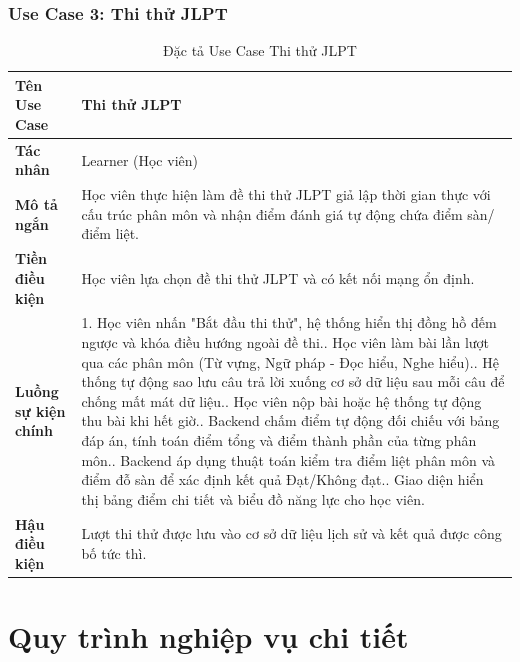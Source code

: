 \documentclass[../DoAn.tex]{subfiles}
\begin{document}
\subsubsection*{Use Case 3: Thi thử JLPT}
\begin{table}[H]
\centering
\small
\renewcommand{\arraystretch}{1.2}


\begin{tabular}{|p{3.5cm}|p{11.0cm}|}
\hline
\textbf{Tên Use Case} & Thi thử JLPT \\
\hline
\textbf{Tác nhân} & Learner (Học viên) \\
\hline
\textbf{Mô tả ngắn} & Học viên thực hiện làm đề thi thử JLPT giả lập thời gian thực với cấu trúc phân môn và nhận điểm đánh giá tự động chứa điểm sàn/điểm liệt. \\
\hline
\textbf{Tiền điều kiện} & Học viên lựa chọn đề thi thử JLPT và có kết nối mạng ổn định. \\
\hline
\textbf{Luồng sự kiện chính} & 
1. Học viên nhấn "Bắt đầu thi thử", hệ thống hiển thị đồng hồ đếm ngược và khóa điều hướng ngoài đề thi.\newline
2. Học viên làm bài lần lượt qua các phân môn (Từ vựng, Ngữ pháp - Đọc hiểu, Nghe hiểu).\newline
3. Hệ thống tự động sao lưu câu trả lời xuống cơ sở dữ liệu sau mỗi câu để chống mất mát dữ liệu.\newline
4. Học viên nộp bài hoặc hệ thống tự động thu bài khi hết giờ.\newline
5. Backend chấm điểm tự động đối chiếu với bảng đáp án, tính toán điểm tổng và điểm thành phần của từng phân môn.\newline
6. Backend áp dụng thuật toán kiểm tra điểm liệt phân môn và điểm đỗ sàn để xác định kết quả Đạt/Không đạt.\newline
7. Giao diện hiển thị bảng điểm chi tiết và biểu đồ năng lực cho học viên. \\
\hline
\textbf{Hậu điều kiện} & Lượt thi thử được lưu vào cơ sở dữ liệu lịch sử và kết quả được công bố tức thì. \\
\hline
\end{tabular}
\caption{Đặc tả Use Case Thi thử JLPT}
\label{tab:spec_jlpt}
\end{table}

\section{Quy trình nghiệp vụ chi tiết}
\label{section:2.3}
\end{document}

